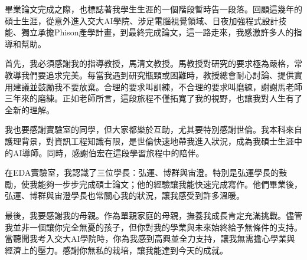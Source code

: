 \begin{acknowledgement}%
\thispagestyle{empty}
畢業論文完成之際，也標誌著我學生生涯的一個階段暫時告一段落。回顧這幾年的碩士生涯，從意外進入交大AI學院、涉足電腦視覺領域、日夜加強程式設計技能、獨立承擔Phison產學計畫，到最終完成論文，這一路走來，我感激許多人的指導和幫助。

首先，我必須感謝我的指導教授，馬清文教授。馬教授對研究的要求極為嚴格，常教導我們要追求完美。每當我遇到研究瓶頸或困難時，教授總會耐心討論、提供實用建議並鼓勵我不要放棄。合理的要求叫訓練，不合理的要求叫磨練，謝謝馬老師三年來的磨練。正如老師所言，這段旅程不僅拓寬了我的視野，也讓我對人生有了全新的理解。

我也要感謝實驗室的同學，但大家都樂於互助，尤其要特別感謝世倫。我本科來自護理背景，對資訊工程知識有限，是世倫快速地帶我進入狀況，成為我碩士生涯中的AI導師。同時，感謝伯宏在這段學習旅程中的陪伴。

在EDA實驗室，我認識了三位學長：弘運、博群與宙澄。特別是弘運學長的鼓勵，使我能夠一步步完成碩士論文；他的經驗讓我能快速完成寫作。他們畢業後，弘運、博群與宙澄學長也常關心我的狀況，讓我感受到許多溫暖。

最後，我要感謝我的母親。作為單親家庭的母親，撫養我成長肯定充滿挑戰。儘管我並非一個讓你完全無憂的孩子，但你對我的學業與未來始終給予無條件的支持。當聽聞我考入交大AI學院時，你為我感到高興並全力支持，讓我無需擔心學業與經濟上的壓力。感謝你無私的栽培，讓我能達到今天的成就。
\end{acknowledgement}